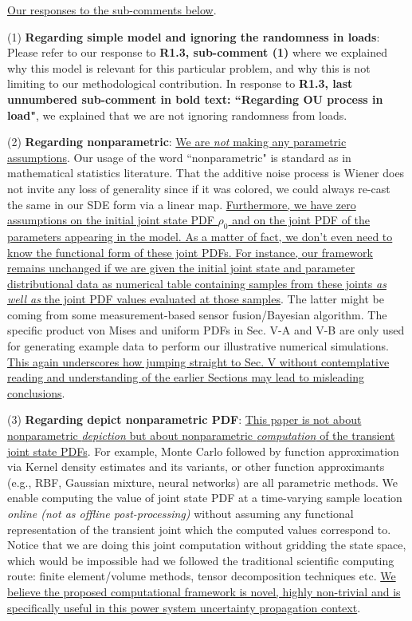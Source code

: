 \documentclass[12pt,onecolumn]{IEEEtran}
\newcommand{\blue}{\color{blue}}
\newcommand{\nib}{\noindent  {\bf Response:} }
\begin{document}
{\nib{ \blue \ul{Our responses to the sub-comments below}.

(1) \textbf{Regarding simple model and ignoring the randomness in loads}: Please refer to our response to \textbf{R1.3, sub-comment (1)} where we explained why this model is relevant for this particular problem, and why this is not limiting to our methodological contribution. In response to \textbf{R1.3, last unnumbered sub-comment in bold text: ``Regarding OU process in load"}, we explained that we are not ignoring randomness from loads.

(2) \textbf{Regarding nonparametric}: \ul{We are \emph{not} making any parametric assumptions}. Our usage of the word ``nonparametric" is standard as in mathematical statistics literature. That the additive noise process is Wiener does not invite any loss of generality since if it was colored, we could always re-cast the same in our SDE form via a linear map. \ul{Furthermore, we have zero assumptions on the initial joint state PDF $\rho_{0}$ and on the joint PDF of the parameters appearing in the model. As a matter of fact, we don't even need to know the functional form of these joint PDFs. For instance, our framework remains unchanged if we are given the initial joint state and parameter distributional data as numerical table containing samples from these joints \emph{as well as} the joint PDF values evaluated at those samples}. The latter might be coming from some measurement-based sensor fusion/Bayesian algorithm. The specific product von Mises and uniform PDFs in Sec. V-A and V-B are only used for generating example data to perform our illustrative numerical simulations. \ul{This again underscores how jumping straight to Sec. V without contemplative reading and understanding of the earlier Sections may lead to misleading conclusions}.

(3) \textbf{Regarding depict nonparametric PDF}: \ul{This paper is not about nonparametric \emph{depiction} but about nonparametric \emph{computation} of the transient joint state PDFs}. For example, Monte Carlo followed by function approximation via Kernel density estimates and its variants, or other function approximants (e.g., RBF, Gaussian mixture, neural networks) are all parametric methods. We enable computing the value of joint state PDF at a time-varying sample location \emph{online (not as offline post-processing)} without assuming any functional representation of the transient joint which the computed values correspond to. Notice that we are doing this joint computation without gridding the state space, which would be impossible had we followed the traditional scientific computing route: finite element/volume methods, tensor decomposition techniques etc. \ul{We believe the proposed computational framework is novel, highly non-trivial and is specifically useful in this power system uncertainty propagation context}.
}}
\end{document}

